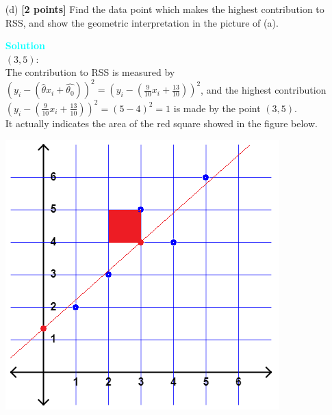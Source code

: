 \documentclass[10pt]{article}
\newenvironment{solution}
    { \begin{mdframed}[backgroundcolor=gray!10] \textcolor{cyan}{\textbf{Solution}} \\}
    {  \end{mdframed}}
\begin{document}
\begin{enumerate}
\begin{itemize}
\begin{solution}
\begin{center}
			            \end{center}
		            \end{solution}
		      \item[(d)] \textbf{[2 points]} Find the data point which makes the highest contribution to RSS, and show the geometric interpretation in the picture of (a).
		            \begin{solution}
			            $(3, 5)$: \\
			            The contribution to RSS is measured by $\left( y_i - \left(\hat{\theta}x_i + \hat{\theta_0}\right) \right)^2= \left( y_i - \left(\frac{9}{10} x_i + \frac{13}{10}\right) \right)^2$,
			            and the highest contribution $\left( y_i - \left(\frac{9}{10} x_i + \frac{13}{10}\right) \right)^2 = (5-4)^2 = 1$ is made by the point $(3,5)$.\\
			            It actually indicates the area of the red square showed in the figure below.
			            \begin{center}
				            \includegraphics[width=.6\linewidth]{c_sol3.png}
			            \end{center}
		            \end{solution}
	      \end{itemize}

\end{enumerate}
\end{document}
